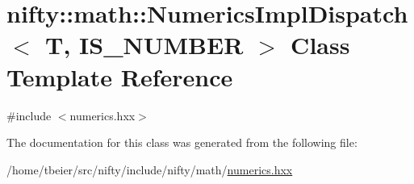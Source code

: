 \hypertarget{classnifty_1_1math_1_1NumericsImplDispatch}{}\section{nifty\+:\+:math\+:\+:Numerics\+Impl\+Dispatch$<$ T, I\+S\+\_\+\+N\+U\+M\+B\+E\+R $>$ Class Template Reference}
\label{classnifty_1_1math_1_1NumericsImplDispatch}


{\ttfamily \#include $<$numerics.\+hxx$>$}



The documentation for this class was generated from the following file\+:\begin{DoxyCompactItemize}
\item 
/home/tbeier/src/nifty/include/nifty/math/\hyperlink{numerics_8hxx}{numerics.\+hxx}\end{DoxyCompactItemize}
